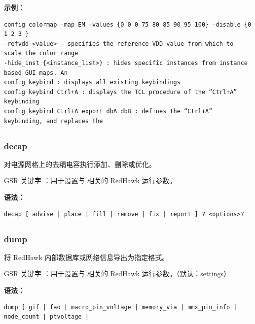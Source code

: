 \textbf{示例：}
\begin{lstlisting}
config colormap -map EM -values {0 0 0 75 80 85 90 95 100} -disable {0 1 2 3 }
-refvdd <value> - specifies the reference VDD value from which to scale the color range
-hide_inst {<instance_list>} : hides specific instances from instance based GUI maps. An
config keybind : displays all existing keybindings
config keybind Ctrl+A : displays the TCL procedure of the “Ctrl+A” keybinding
config keybind Ctrl+A export dbA dbB : defines the “Ctrl+A” keybinding, and replaces the
\end{lstlisting}

\subsection{}
\subsubsection*{decap}

对电源网格上的去耦电容执行添加、删除或优化。

GSR 关键字 ：用于设置与  相关的 RedHawk 运行参数。

\textbf{语法：}
\begin{lstlisting}
decap [ advise | place | fill | remove | fix | report ] ? <options>?
\end{lstlisting}

\subsection{}
\subsubsection*{dump}

将 RedHawk 内部数据库或网络信息导出为指定格式。

GSR 关键字 ：用于设置与  相关的 RedHawk 运行参数。（默认：settings）

\textbf{语法：}
\begin{lstlisting}
dump [ gif | fao | macro_pin_voltage | memory_via | mmx_pin_info | node_count | ptvoltage |
\end{lstlisting}

